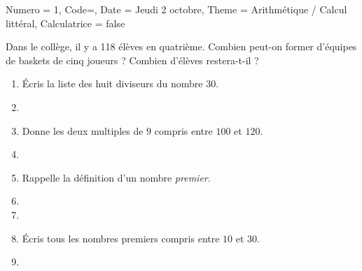 \documentclass[11pt]{article}
\newcommand{\ligne}{{\color{gray!60}\hrulefill}}
\begin{document}
\begin{Maquette}[IE]{
        Numero = 1, Code={}, Date = Jeudi 2 octobre, Theme = Arithmétique / Calcul littéral, Calculatrice = false
    }
    \begin{multicols}{2}

        \begin{exercice}
             Dans le collège, il y a 118 élèves en quatrième. Combien peut-on former d’équipes de baskets de cinq joueurs ? Combien d’élèves restera-t-il ?
        \end{exercice}
        \begin{exercice}
            \begin{enumerate}
                \item Écris la liste des huit diviseurs du nombre $30$.
                \item[] \ligne
                \item Donne les deux multiples de $9$ compris entre $100$ et $120$.
                \item[] \ligne
                \item Rappelle la définition d’un nombre \emph{premier}.
                \item[] \ligne
                \item[] \ligne
                \item Écris tous les nombres premiers compris entre $10$ et $30$.
                \item[] \ligne


\end{enumerate}
\end{exercice}
\end{multicols}
\end{Maquette}
\end{document}
